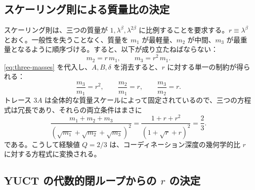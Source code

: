\documentclass[11pt,a4paper]{article}
\theoremstyle{remark}
\begin{document}
	\subsection{スケーリング則による質量比の決定}
	
	スケーリング則は、三つの質量が \(1, \lambda^{\beta}, \lambda^{2\beta}\) に比例することを要求する。\(r \equiv \lambda^{\beta}\) とおく。一般性を失うことなく、質量を \(m_1\) が最軽量、\(m_2\) が中間、\(m_3\) が最重量となるように順序づける。すると、以下が成り立たねばならない：
	\begin{equation}
		m_2 = r\, m_1, \qquad m_3 = r^2\, m_1 .
	\end{equation}
	\eqref{eq:three-masses} を代入し、\(A,B,\delta\) を消去すると、\(r\) に対する単一の制約が得られる：
	\begin{equation}
		\frac{m_3}{m_1} = r^2, \qquad
		\frac{m_2}{m_1} = r, \qquad
		\frac{m_3}{m_2} = r .
	\end{equation}
	トレース \(3A\) は全体的な質量スケールによって固定されているので、三つの方程式は冗長であり、それらの両立条件はまさに
	\begin{equation}
		\frac{m_1 + m_2 + m_3}{(\sqrt{m_1}+\sqrt{m_2}+\sqrt{m_3})^2}
		= \frac{1 + r + r^2}{(1 + \sqrt{r} + r)^2} = \frac{2}{3}.
		\label{eq:Qr}
	\end{equation}
	である。こうして経験値 \(Q=2/3\) は、コーディネーション深度の幾何学的比 \(r\) に対する方程式に変換される。
	
	\subsection{YUCT の代数的閉ループからの \(r\) の決定}
	
\end{document}

